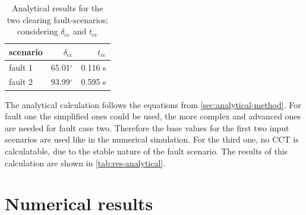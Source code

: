 \begin{table}
        \vspace{-12pt}
        \small
        \centering
        \caption[Analytical results for the two clearing fault-scenarios]{Analytical results for the two clearing fault-scenarios; considering $\delta_\mathrm{cc}$ and $t_\mathrm{cc}$}
        \label{tab:res-analytical}
        \vspace{12pt}
        \begin{tabular}{|l|r|r|}
                \hline
                \rowcolor{lightgray} scenario & $\delta_\mathrm{cc}$ & $t_\mathrm{cc}$  \\ \hline \hline
                fault 1              & 65.01$^\circ$        & 0.116 s                         \\ \hline
                fault 2              & 93.99$^\circ$        & 0.595 s \\ \hline
        \end{tabular}
\end{table}
The analytical calculation follows the equations from \autoref{sec:analytical-method}. For fault one the simplified ones could be used, the more complex and advanced ones are needed for fault case two. Therefore the base values for the first two input scenarios are used like in the numerical simulation. For the third one, no \acs{CCT} is calculatable, due to the stable nature of the fault scenario. The results of this calculation are shown in \autoref{tab:res-analytical}.


\section{Numerical results}

